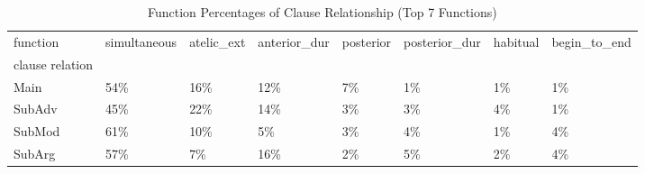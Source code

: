 \begin{table}[htbp!]
\centering
\caption{Function Percentages of Clause Relationship (Top 7 Functions)}
\label{table:typerel_pr}
\begin{adjustbox}{width=1\textwidth}
\begin{tabular}{llllllll}
\toprule
function & simultaneous & atelic\_ext & anterior\_dur & posterior & posterior\_dur & habitual & begin\_to\_end \\
clause relation &              &            &              &           &               &          &              \\
\midrule
Main            &          54\% &        16\% &          12\% &        7\% &            1\% &       1\% &           1\% \\
SubAdv          &          45\% &        22\% &          14\% &        3\% &            3\% &       4\% &           1\% \\
SubMod          &          61\% &        10\% &           5\% &        3\% &            4\% &       1\% &           4\% \\
SubArg          &          57\% &         7\% &          16\% &        2\% &            5\% &       2\% &           4\% \\
\bottomrule
\end{tabular}
\end{adjustbox}
\end{table}
